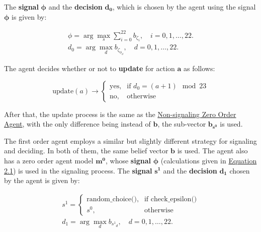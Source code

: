 The \textbf{signal} $\mathbf{\phi}$ and the \textbf{decision} $\mathbf{d_0}$, which is chosen by the agent using the signal $\mathbf{\phi}$ is given by: 

\begin{equation}
\label{eq:zero-order-signal}
\begin{aligned}
    \phi = \arg\max_s \sum_{i=0}^{22} b_{\zeta_i}, \quad i = 0, 1, \ldots, 22. \\
    d_0 = \arg\max_d b_{\zeta_{\phi_d}}, \quad d = 0, 1, \ldots, 22.
\end{aligned}
\end{equation}

The agent decides whether or not to \textbf{update} for action $\mathbf{a}$ as follows: 

\begin{equation}
\text{{update}}(a) \rightarrow \begin{cases}
\text{{yes}}, & \text{{if }} d_0 = (a + 1) \mod 23 \\
\text{{no}}, & \text{{otherwise}}
\end{cases}
\end{equation}

After that, the update process is the same as the \hyperref[eq:zero-order-update]{Non-signaling Zero Order Agent}, with the only difference being instead of $\mathbf{b}$, the sub-vector $\mathbf{b_{s^0}}$ is used.


The first order agent employs a similar but slightly different strategy for signaling and deciding. In both of them, the same belief vector $\mathbf{b}$ is used. The agent also has a zero order agent model $\mathbf{m^0}$, whose \textbf{signal} $\mathbf{\phi}$ (calculations given in \hyperref[eq:zero-order-signal]{Equation 2.1}) is used in the  signaling process. The \textbf{signal} $\mathbf{s^1}$ and the \textbf{decision} $\mathbf{d_1}$ chosen by the agent is given by:

\begin{equation*}
\begin{aligned}
    s^1 = \begin{cases}
        \text{{random\_choice()}}, & \text{{if }} \text{{check\_epsilon()}} \\
        s^0, & \text{{otherwise}}
    \end{cases} \\
    d_1 = \arg\max_d b_{{s^1}_d}, \quad d = 0, 1, \ldots, 22. \qquad
\end{aligned}
\end{equation*}

